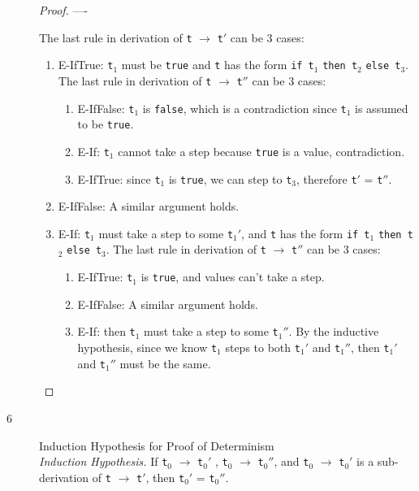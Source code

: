 \documentclass{article}
\begin{document}
\begin{description}
\begin{proof}
      ----

      The last rule in derivation of \verb|t| $\longrightarrow$ \verb|t|$'$ can be 3 cases:
      \begin{enumerate} 
        \item E-IfTrue: \verb|t|$_1$ must be \verb|true| and \verb|t| has the form
        \verb|if t|$_1$ \verb|then t|$_2$ \verb|else t|$_3$.
          The last rule in derivation of \verb|t| $\longrightarrow$ \verb|t|$''$ can be 3 cases:
          \begin{enumerate} 
            \item E-IfFalse: \verb|t|$_1$ is \verb|false|, which is a contradiction since \verb|t|$_1$ is assumed to be \verb|true|.
            \item E-If: \verb|t|$_1$ cannot take a step because \verb|true| is a value, contradiction.
            \item E-IfTrue: since \verb|t|$_1$ is \verb|true|, we can step to \verb|t|$_3$, therefore \verb|t|$'$ = \verb|t|$''$.
          \end{enumerate}

        \item E-IfFalse: A similar argument holds.

        \item E-If: \verb|t|$_1$ must take a step to some \verb|t|$_1'$, and \verb|t| has the form
        \verb|if t|$_1$ \verb|then t|$_2$ \verb|else t|$_3$.
        The last rule in derivation of \verb|t| $\longrightarrow$ \verb|t|$''$ can be 3 cases:
          \begin{enumerate} 
            \item E-IfTrue: \verb|t|$_1$ is \verb|true|, and values can't take a step.
            \item E-IfFalse: A similar argument holds.
            \item E-If: then \verb|t|$_1$ must take a step to some \verb|t|$_1''$. By the inductive hypothesis, since we know \verb|t|$_1$ steps to both \verb|t|$_1'$ and \verb|t|$_1''$, 
            then \verb|t|$_1'$ and \verb|t|$_1''$ must be the same.
            \end{enumerate}
      \end{enumerate}
    \end{proof}

  \item[6]{Induction Hypothesis for Proof of Determinism}
    \vspace{0.3cm}\\
    \textit{Induction Hypothesis.} If \verb|t|$_0$ $\longrightarrow$ \verb|t|$_0'$ , \verb|t|$_0$ $\longrightarrow$ \verb|t|$_0''$, and \verb|t|$_0$ $\longrightarrow$ \verb|t|$_0'$ is a sub-derivation of \verb|t| $\longrightarrow$ \verb|t|$'$, then \verb|t|$_0'$ = \verb|t|$_0''$.


\end{description}
\end{document}
